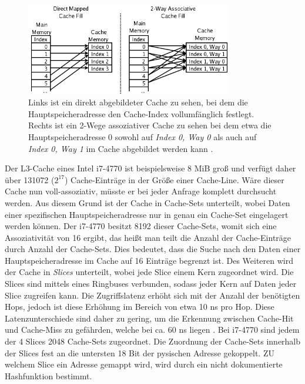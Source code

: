 \begin{figure}[h]
\label{fig:CacheAsso}
\caption{Links ist ein direkt abgebildeter Cache zu sehen, bei dem die Hauptspeicheradresse den Cache-Index vollumfänglich festlegt. Rechts ist ein 2-Wege assoziativer Cache zu sehen bei dem etwa die Hauptspeicheradresse 0 sowohl auf \textit{Index 0, Way 0} als auch auf \textit{Index 0, Way 1} im Cache abgebildet werden kann \cite{CacheAssoWiki}.}
\centering
\includegraphics[width=0.8\textwidth]{basics/Cache_Asso.png}
\end{figure}

Der L3-Cache eines Intel i7-4770 ist beispielsweise 8 MiB groß und verfügt daher über 131072 ($2^{17}$) Cache-Einträge in der Größe einer Cache-Line. 
Wäre dieser Cache nun voll-assoziativ, müsste er bei jeder Anfrage komplett durchsucht werden. Aus diesem Grund ist der Cache in Cache-Sets unterteilt, wobei Daten einer spezifischen Hauptspeicheradresse nur in genau ein Cache-Set eingelagert werden können. 
Der i7-4770 besitzt 8192 dieser Cache-Sets, womit sich eine Assoziativität von 16 ergibt, das heißt man teilt die Anzahl der Cache-Einträge durch Anzahl der Cache-Sets. Dies bedeutet, dass die Suche nach den Daten einer Hauptspeicheradresse im Cache auf 16 Einträge begrenzt ist. 
Des Weiteren wird der Cache in \textit{Slices} unterteilt, wobei jede Slice einem Kern zugeordnet wird. Die Slices sind mittels eines Ringbuses verbunden, sodass jeder Kern auf Daten jeder Slice zugreifen kann. Die Zugriffslatenz erhöht sich mit der Anzahl der benötigten Hops, jedoch ist diese Erhöhung im Bereich von etwa 10 ns pro Hop. Diese Latenzunterschiede sind daher zu gering, um die Erkennung zwischen Cache-Hit und Cache-Miss zu gefährden, welche bei ca. 60 ns liegen \cite{TheSpyInTheSandbox}. Bei i7-4770 sind jedem der 4 Slices 2048 Cache-Sets zugeordnet. Die Zuordnung der Cache-Sets innerhalb der Slices fest an die untersten 18 Bit der pysischen Adresse gekoppelt. ZU welchem Slice ein Adresse gemappt wird, wird durch ein nicht dokumentierte Hashfunktion bestimmt.


